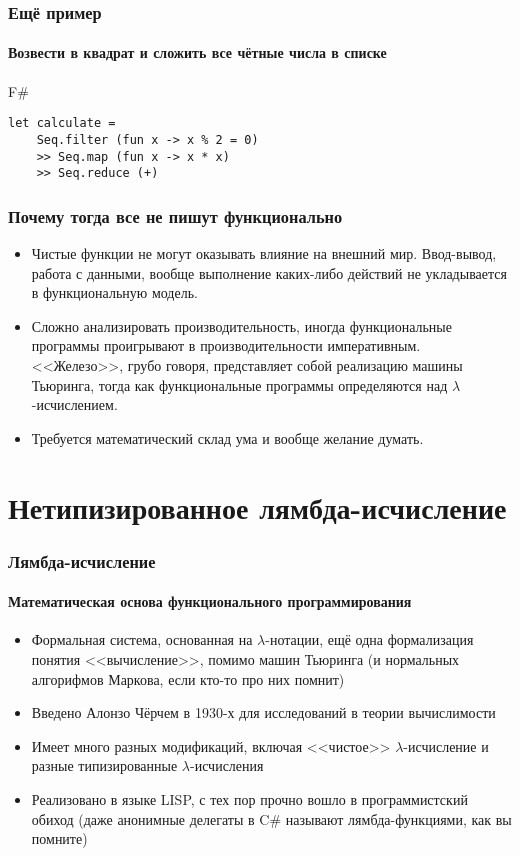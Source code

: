 \documentclass[xetex,mathserif,serif]{beamer}
\begin{document}
	\begin{frame}[fragile]
		\frametitle{Ещё пример}
		\framesubtitle{Возвести в квадрат и сложить все чётные числа в списке}
		\begin{exampleblock}{F\#}
			\begin{lstlisting}
let calculate = 
    Seq.filter (fun x -> x % 2 = 0) 
    >> Seq.map (fun x -> x * x) 
    >> Seq.reduce (+)
            \end{lstlisting}
		\end{exampleblock}
\end{frame}

	\begin{frame}
		\frametitle{Почему тогда все не пишут функционально}
		\begin{itemize}
			\item Чистые функции не могут оказывать влияние на внешний мир. Ввод-вывод, работа с данными,
					вообще выполнение каких-либо действий не укладывается в функциональную модель.
			\item Сложно анализировать производительность, иногда функциональные программы проигрывают
					в производительности императивным. <<Железо>>, грубо говоря, представляет собой 
					реализацию машины Тьюринга, тогда как функциональные программы определяются над
					$\lambda$-исчислением.
			\item Требуется математический склад ума и вообще желание думать.
		\end{itemize}
	\end{frame}

	\section{Нетипизированное лямбда-исчисление}

	\begin{frame}
		\frametitle{Лямбда-исчисление}
		\framesubtitle{Математическая основа функционального программирования}
		\begin{itemize}
			\item Формальная система, основанная на $\lambda$-нотации, ещё одна формализация
					понятия <<вычисление>>, помимо машин Тьюринга (и нормальных алгорифмов
					Маркова, если кто-то про них помнит)
			\item Введено Алонзо Чёрчем в 1930-х для исследований в теории вычислимости
			\item Имеет много разных модификаций, включая <<чистое>> $\lambda$-исчисление и
					разные типизированные $\lambda$-исчисления
			\item Реализовано в языке LISP, с тех пор прочно вошло в программистский обиход
					(даже анонимные делегаты в C\# называют лямбда-функциями, как вы помните)
		\end{itemize}
	\end{frame}
	
\end{document}
